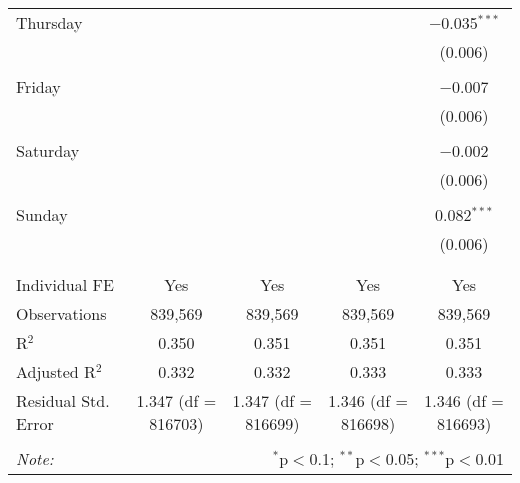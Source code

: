 \documentclass[
]{article}
\begin{document}
\begin{table}[!htbp]
{\begin{tabular}{@{\extracolsep{5pt}}lcccc}
 Thursday &  &  &  & $-$0.035$^{***}$ \\ 
  &  &  &  & (0.006) \\ 
  & & & & \\ 
 Friday &  &  &  & $-$0.007 \\ 
  &  &  &  & (0.006) \\ 
  & & & & \\ 
 Saturday &  &  &  & $-$0.002 \\ 
  &  &  &  & (0.006) \\ 
  & & & & \\ 
 Sunday &  &  &  & 0.082$^{***}$ \\ 
  &  &  &  & (0.006) \\ 
  & & & & \\ 
\hline \\[-1.8ex] 
Individual FE & Yes & Yes & Yes & Yes \\ 
Observations & 839,569 & 839,569 & 839,569 & 839,569 \\ 
R$^{2}$ & 0.350 & 0.351 & 0.351 & 0.351 \\ 
Adjusted R$^{2}$ & 0.332 & 0.332 & 0.333 & 0.333 \\ 
Residual Std. Error & 1.347 (df = 816703) & 1.347 (df = 816699) & 1.346 (df = 816698) & 1.346 (df = 816693) \\ 
\hline 
\hline \\[-1.8ex] 
\textit{Note:}  & \multicolumn{4}{r}{$^{*}$p$<$0.1; $^{**}$p$<$0.05; $^{***}$p$<$0.01} \\ 
\end{tabular}
} 
\end{table} 
\newpage
\end{document}
